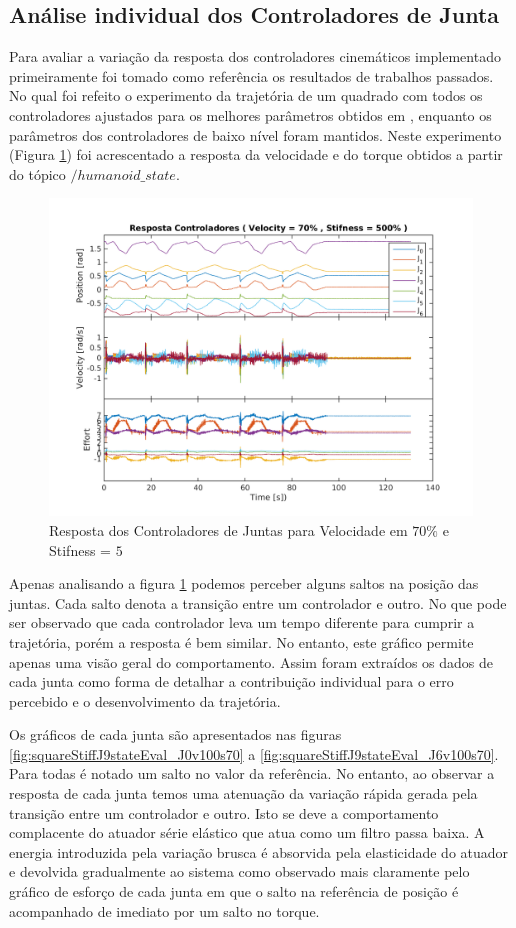 \subsection{Análise individual dos Controladores de Junta}

Para avaliar a variação da resposta dos controladores cinemáticos implementado primeiramente foi tomado como referência os resultados de trabalhos passados. No qual foi refeito o experimento da trajetória de um quadrado com todos os controladores ajustados para os melhores parâmetros obtidos em \cite{marcosps2016}, enquanto os parâmetros dos controladores de baixo nível foram mantidos. Neste experimento (Figura \ref{fig:squareStiffMarcos}) foi acrescentado a resposta da velocidade e do torque obtidos a partir do tópico $/humanoid\_state$.

\begin{figure}[H]
    \centering
    \includegraphics[width=0.8\linewidth,trim={2cm 1cm 2cm 0.5cm}]{tex/figs/squareStifff4stateEvalv70s500.png}
    \caption{Resposta dos Controladores de Juntas para Velocidade em $70\%$ e Stifness = $5$ }
    \label{fig:squareStiffMarcos}
\end{figure}

Apenas analisando a figura \ref{fig:squareStiffMarcos} podemos perceber alguns saltos na posição das juntas. Cada salto denota a transição entre um controlador e outro. No que pode ser observado que cada controlador leva um tempo diferente para cumprir a trajetória, porém a resposta é bem similar. No entanto, este gráfico permite apenas uma visão geral do comportamento. Assim foram extraídos os dados de cada junta como forma de detalhar a contribuição individual para o erro percebido e o desenvolvimento da trajetória.

Os gráficos de cada junta são apresentados nas figuras \ref{fig:squareStiffJ9stateEval_J0v100s70} a \ref{fig:squareStiffJ9stateEval_J6v100s70}. Para todas é notado um salto no valor da referência. No entanto, ao observar a resposta de cada junta temos uma atenuação da variação rápida gerada pela transição entre um controlador e outro. Isto se deve a comportamento complacente do atuador série elástico que atua como um filtro passa baixa. A energia introduzida pela variação brusca é absorvida pela elasticidade do atuador e devolvida gradualmente ao sistema como observado mais claramente pelo gráfico de esforço de cada junta em que o salto na referência de posição é acompanhado de imediato por um salto no torque. 

